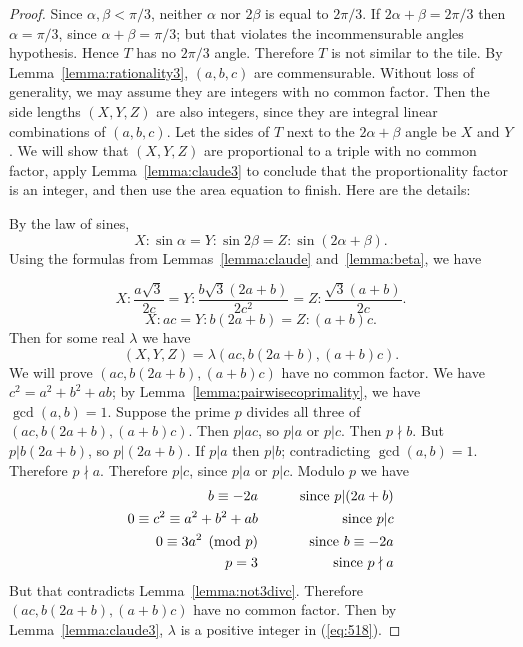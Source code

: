 \documentclass[10pt,a4paper]{amsart}
\begin{document}
\begin{proof}  Since $\alpha, \beta < \pi/3$,  neither $\alpha$ nor $2\beta$ is equal to $2\pi/3$.
If $2\alpha + \beta = 2\pi/3$ then $\alpha = \pi/3$, since $\alpha + \beta = \pi/3$; but that
violates the incommensurable angles hypothesis.  Hence $T$ has no $2\pi/3$ angle. 
Therefore $T$ is not similar to the tile.
By Lemma~\ref{lemma:rationality3}, $(a,b,c)$ are commensurable.
Without loss of generality, we may assume they are integers with no common factor.
Then the side lengths $(X,Y,Z)$ are also integers, since they are integral linear
combinations of $(a,b,c)$. 
Let the sides of $T$ next to the $2\alpha + \beta$ angle be $X$ and $Y$.  
We will show that $(X,Y,Z)$  are proportional to a triple with
no common factor, apply Lemma~\ref{lemma:claude3} to conclude
that the proportionality factor is an integer, 
and then use the area equation to finish.   Here are the details:

By the law of sines,
$$ X: {\sin \alpha} =   Y :{\sin 2 \beta} = Z :{\sin( 2\alpha + \beta)}.$$
Using the formulas from Lemmas~\ref{lemma:claude} and~\ref{lemma:beta}, we have 

$$ X: \frac {a \sqrt 3}{2c} = Y:\frac {b \sqrt 3 (2a+b)}{2c^2} = Z: \frac{\sqrt 3 (a+b)}{2c}.$$
$$ X: ac = Y : b(2a+b) = Z: (a+b)c.$$
Then for some real $\lambda$ we have
\begin{equation}
 (X,Y,Z) = \lambda (ac, b(2a+b), (a+b)c). \label{eq:518}
 \end{equation}
We will prove $(ac,b(2a+b),(a+b)c)$ have no common factor. 
We have $c^2 = a^2 + b^2 + ab$; by Lemma~\ref{lemma:pairwisecoprimality},
we have $\gcd(a,b) = 1$. 
Suppose the prime $p$ divides all three of $(ac,b(2a+b),(a+b)c)$.
  Then $p | ac$, so 
$p | a$ or $p | c$.  Then $p \nmid b$.  But $p | b(2a+b)$,
so $p | (2a+b)$.  If $p | a$ then $p | b$; contradicting $\gcd(a,b) = 1$. 
Therefore $p \nmid a$. Therefore $p | c$, since $p | a$ or $p | c$. 
Modulo $p$ we have
\begin{eqnarray*}
b \equiv -2a   && \mbox{\qquad since $p | (2a+b)$}\\
0 \equiv c^2 \equiv a^2 + b^2 + ab && \mbox{\qquad since $p | c$}\\
0  \equiv 3a^2 \pmod p  && \mbox{\qquad since $b \equiv -2a$}\\
p = 3                && \mbox{\qquad since $p \nmid a$}\\
\end{eqnarray*}
But that contradicts Lemma~\ref{lemma:not3divc}.
Therefore $(ac,b(2a+b),(a+b)c)$ have no common factor. 
Then by Lemma~\ref{lemma:claude3}, $\lambda$ is a positive integer in (\ref{eq:518}).


\end{proof}
\end{document}

